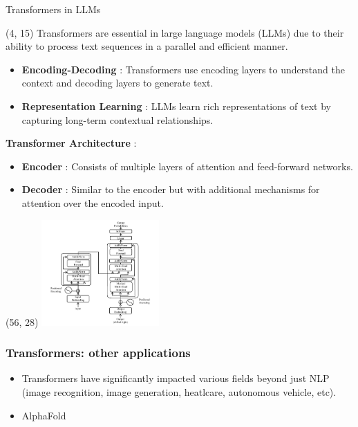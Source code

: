 \begin{frame}{Transformers in LLMs}
  \begin{textblock}{55}(4, 15)
    Transformers are essential in large language models (LLMs) due to their ability to process text sequences in a parallel and efficient manner.

    \begin{itemize}
        \item \textbf{Encoding-Decoding} : Transformers use encoding layers to understand the context and decoding layers to generate text.
        \item \textbf{Representation Learning} : LLMs learn rich representations of text by capturing long-term contextual relationships.
    \end{itemize}

    \textbf{Transformer Architecture} : \\
    \begin{itemize}
        \item \textbf{Encoder} : Consists of multiple layers of attention and feed-forward networks.
        \item \textbf{Decoder} : Similar to the encoder but with additional mechanisms for attention over the encoded input.
    \end{itemize}
  \end{textblock}
  \begin{textblock}{35}(56, 28)
    \includegraphics[width=170px]{img/transformer_architecture.png} %
  \end{textblock}
\end{frame}


\begin{frame}
  \frametitle{Transformers: other applications}
  \begin{itemize}
    \item Transformers have significantly impacted various fields beyond just NLP (image recognition, image generation, heatlcare, autonomous vehicle, etc).
    \item AlphaFold
  \end{itemize}
  

\end{frame}

